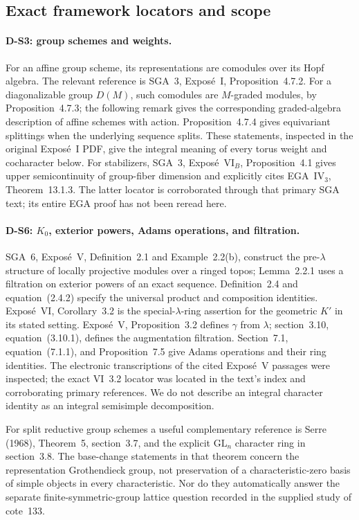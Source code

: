 \documentclass[11pt,a4paper]{article}
\theoremstyle{definition}\newtheorem{definition}{Definition}
\begin{document}
\subsection{Exact framework locators and scope}

\paragraph{D-S3: group schemes and weights.}
For an affine group scheme, its representations are comodules over its Hopf algebra. The relevant reference is SGA~3, Expos\'e~I, Proposition~4.7.2. For a diagonalizable group $D(M)$, such comodules are $M$-graded modules, by Proposition~4.7.3; the following remark gives the corresponding graded-algebra description of affine schemes with action. Proposition~4.7.4 gives equivariant splittings when the underlying sequence splits. These statements, inspected in the original Expos\'e~I PDF, give the integral meaning of every torus weight and cocharacter below. For stabilizers, SGA~3, Expos\'e~VI$_B$, Proposition~4.1 gives upper semicontinuity of group-fiber dimension and explicitly cites EGA~IV$_3$, Theorem~13.1.3. The latter locator is corroborated through that primary SGA text; its entire EGA proof has not been reread here.

\paragraph{D-S6: $K_0$, exterior powers, Adams operations, and filtration.}
SGA~6, Expos\'e~V, Definition~2.1 and Example~2.2(b), construct the pre-$\lambda$ structure of locally projective modules over a ringed topos; Lemma~2.2.1 uses a filtration on exterior powers of an exact sequence. Definition~2.4 and equation~(2.4.2) specify the universal product and composition identities. Expos\'e~VI, Corollary~3.2 is the special-$\lambda$-ring assertion for the geometric $K'$ in its stated setting. Expos\'e~V, Proposition~3.2 defines $\gamma$ from $\lambda$; section~3.10, equation~(3.10.1), defines the augmentation filtration. Section~7.1, equation~(7.1.1), and Proposition~7.5 give Adams operations and their ring identities. The electronic transcriptions of the cited Expos\'e~V passages were inspected; the exact VI~3.2 locator was located in the text's index and corroborating primary references. We do not describe an integral character identity as an integral semisimple decomposition.

For split reductive group schemes a useful complementary reference is Serre (1968), Theorem~5, section~3.7, and the explicit $\mathrm{GL}_n$ character ring in section~3.8. The base-change statements in that theorem concern the representation Grothendieck group, not preservation of a characteristic-zero basis of simple objects in every characteristic. Nor do they automatically answer the separate finite-symmetric-group lattice question recorded in the supplied study of cote~133.
\end{document}

